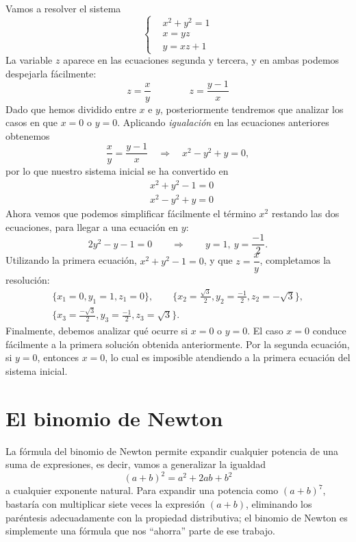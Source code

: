 %
\begin{ejemplo}
Vamos a resolver el sistema
\[
\left\{\begin{array}{cl}
&x^2+y^2=1\\
&x=yz\\
&y=xz+1
\end{array}\right.
\]
La variable $z$ aparece en las ecuaciones segunda y tercera, y en ambas podemos despejarla fácilmente:
\begin{equation}
z=\frac{x}{y}\qquad\qquad
z=\frac{y-1}x\label{ej:igualacion}
\end{equation}
Dado que hemos dividido entre $x$ e $y$, posteriormente tendremos que analizar los casos en que $x=0$ o $y=0$.
Aplicando \emph{igualación} en las ecuaciones anteriores obtenemos
\[
\frac{x}{y}=\frac{y-1}x\quad\Rightarrow\quad x^2-y^2+y=0,
\]
por lo que nuestro sistema inicial se ha convertido en
\begin{align*}
& x^2+y^2-1=0\\
& x^2-y^2+y=0
\end{align*}
Ahora vemos que podemos simplificar fácilmente el término $x^2$ restando las dos ecuaciones, para llegar a una ecuación en $y$:
\[
2y^2-y-1=0\qquad\Rightarrow\qquad y=1,\ y=\frac{-1}2.
\]
Utilizando la primera ecuación, $x^2+y^2-1=0$, y que $z=\dfrac{x}{y}$, completamos la resolución:
\begin{multline*}
\{x_1=0, y_1=1, z_1=0\},\qquad \{x_2=\frac{\sqrt3}2,y_2=\frac{-1}2, z_2=-\sqrt3\},\\
\{x_3=\frac{-\sqrt3}2,y_3=\frac{-1}2, z_3=\sqrt3\}.
\end{multline*}
Finalmente, debemos analizar qué ocurre si $x=0$ o $y=0$.
El caso $x=0$ conduce fácilmente a la primera solución obtenida anteriormente.
Por la segunda ecuación, si $y=0$, entonces $x=0$, lo cual es imposible atendiendo a la primera ecuación del sistema inicial.\fej
\end{ejemplo}

\newpage

%
%
%


\section{El binomio de Newton}

La fórmula del binomio de Newton permite expandir cualquier potencia de una suma de expresiones, es decir, vamos a generalizar la igualdad
\[
(a+b)^2 = a^2 + 2ab + b^2
\]
a cualquier exponente natural.
Para expandir una potencia como $(a+b)^7$, bastaría con multiplicar siete veces la expresión $(a+b)$, eliminando los paréntesis adecuadamente con la propiedad distributiva;
el binomio de Newton es simplemente una fórmula que nos ``ahorra'' parte de ese trabajo.


